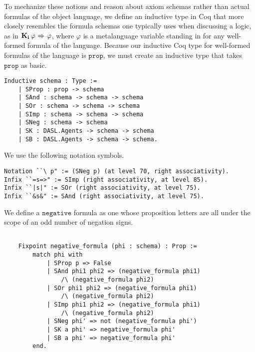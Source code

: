To mechanize these notions and reason about axiom schemas rather than actual formulas of the object language, we define an inductive type in Coq that more closely resembles the formula schemas one typically uses when discussing a logic, as in $\mathbf{K}_{\mathbf{i}}\,\varphi {\ \Rightarrow \ } \varphi$, where $\varphi$ is a metalanguage variable standing in for any well-formed formula of the language. Because our inductive Coq type for well-formed formulas of the language is $\mathtt{prop}$, we must create an inductive type that takes $\mathtt{prop}$ as basic.

\begin{tcolorbox}
	\begin{lstlisting}[language=Coq]
 Inductive schema : Type :=
	| SProp : prop -> schema
	| SAnd : schema -> schema -> schema
	| SOr : schema -> schema -> schema
	| SImp : schema -> schema -> schema
	| SNeg : schema -> schema
	| SK : DASL.Agents -> schema -> schema
	| SB : DASL.Agents -> schema -> schema.
	\end{lstlisting}	
	
\end{tcolorbox}
We use the following notation symbols.

\begin{tcolorbox}
	\begin{lstlisting}[language=Coq]
Notation ``\ p" := (SNeg p) (at level 70, right associativity).
Infix ``=s=>" := SImp (right associativity, at level 85).
Infix ``|s|" := SOr (right associativity, at level 75).
Infix ``&s&" := SAnd (right associativity, at level 75).
	\end{lstlisting}
\end{tcolorbox}
We define a $\mathtt{negative}$ formula as one whose proposition letters are all under the scope of an odd number of negation signs.

\begin{tcolorbox}
	\begin{lstlisting}[language=Coq]
	
	Fixpoint negative_formula (phi : schema) : Prop :=
		match phi with
			| SProp p => False
			| SAnd phi1 phi2 => (negative_formula phi1) 
				/\ (negative_formula phi2)
			| SOr phi1 phi2 => (negative_formula phi1) 
				/\ (negative_formula phi2)
			| SImp phi1 phi2 => (negative_formula phi1) 
				/\ (negative_formula phi2)
			| SNeg phi' => not (negative_formula phi')
			| SK a phi' => negative_formula phi'
			| SB a phi' => negative_formula phi'
		end.
	\end{lstlisting}	
	
\end{tcolorbox}

